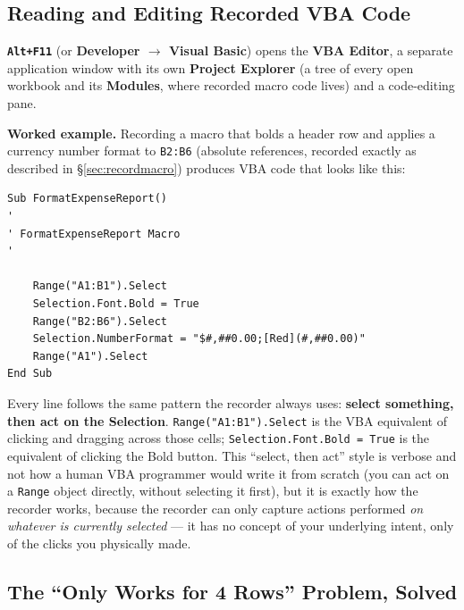 \documentclass[11pt,a4paper]{article}
\newcommand{\key}[1]{\texttt{\colorbox{black!8}{\textbf{#1}}}}
\begin{document}
\subsection{Reading and Editing Recorded VBA Code}
\label{sec:vbaeditor}

\begin{formulasyntax}
\key{Alt+F11} (or \textbf{Developer $\rightarrow$ Visual Basic}) opens the \textbf{VBA Editor}, a separate application window with its own \textbf{Project Explorer} (a tree of every open workbook and its \textbf{Modules}, where recorded macro code lives) and a code-editing pane.
\end{formulasyntax}

\textbf{Worked example.} Recording a macro that bolds a header row and applies a currency number format to \texttt{B2:B6} (absolute references, recorded exactly as described in \S\ref{sec:recordmacro}) produces VBA code that looks like this:

\begin{lstlisting}[style=vbastyle, caption={Recorded macro: format a header row and a fixed range of amounts}]
Sub FormatExpenseReport()
'
' FormatExpenseReport Macro
'

    Range("A1:B1").Select
    Selection.Font.Bold = True
    Range("B2:B6").Select
    Selection.NumberFormat = "$#,##0.00;[Red](#,##0.00)"
    Range("A1").Select
End Sub
\end{lstlisting}

\begin{keyconcept}
Every line follows the same pattern the recorder always uses: \textbf{select something, then act on the Selection}. \texttt{Range("A1:B1").Select} is the VBA equivalent of clicking and dragging across those cells; \texttt{Selection.Font.Bold = True} is the equivalent of clicking the Bold button. This ``select, then act'' style is verbose and not how a human VBA programmer would write it from scratch (you can act on a \texttt{Range} object directly, without selecting it first), but it is exactly how the recorder works, because the recorder can only capture actions performed \emph{on whatever is currently selected} --- it has no concept of your underlying intent, only of the clicks you physically made.
\end{keyconcept}

\subsection{The ``Only Works for 4 Rows'' Problem, Solved}
\label{sec:macrofix}
\end{document}
